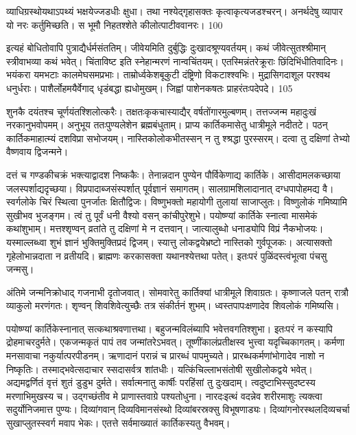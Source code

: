 व्याधिग्रस्थोयथाऽपथ्यं भक्षयेज्जडधीः क्षुधा।
तथा नश्येद्गृहासक्तः कृत्वाकृत्यजडश्चरन्।
अनर्थदेषु व्यापार यो नरः कर्तुमिच्छति।
स भूमौ निहतश्शेते कीलोत्पाटीववानरः।
100

इत्यहं बोधितोवापि पुत्राद्यैर्धर्मसंततिम्।
जीवेयमिति दुर्बुद्धिः दुःखादश्रूण्यवर्तयम्।
कथं जीवेत्सुतश्श्रीमान् स्त्रीवाभव्या कथं भवेत्।
चिंताविष्ट इति स्नेहान्मरणं नान्वचिंतयम्।
एतस्मिन्नंतरेक्रूराः छिंदिभिंधीतिवादिनः।
भयंकरा यमभटाः कालमेघसमप्रभाः।
ताम्रोर्ध्वकेशबूकुटी दंष्ट्रिणो विकटाश्श्वभिः।
मुद्रासिगदाशूल परश्वथ धनुर्धराः।
पाशैर्लोहमयैर्वेगाद् धृडंबद्धा ह्यधोमुखम्।
जिह्वां पाशेनकषतः प्राहरंतःपदेपदे।
105

शुनकै दयंतश्च चूर्णयंतश्शिलोत्करैः।
तक्षतःकृकचास्याद्यैर् वर्षतोंगारमुल्बणम्।
तत्तज्जन्म महादुःखं नरकानुभवोपमम्।
अनुभूय ततःपुण्यलेशेन ब्रह्मबंधुताम्।
प्राप्य कार्तिकमासेतु धात्रीमूले नदीतटे।
पठन् कार्तिकमाहात्म्यं दशविप्रा सभोजयम्।
नास्तिकोलोकभीतस्सन् न तु श्श्रद्धा पुरस्सरम्।
दत्वा तु दक्षिणां तेभ्यो वैष्णवाय द्विजन्मने।

दत्तं च गण्डकीचक्रं भक्त्याद्वादश निष्ककैः।
तेनान्नदान पुण्येन पौर्विकेणाद्य कार्तिके।
आसीदामलकच्छाया जलस्पर्शाद्यदृच्छया।
विप्रपादाब्जसंस्पर्शात् पूर्वज्ञानं समागतम्।
सालग्रामशिलादानात् दग्धपापोहमद्य वै।
स्वर्गलोके चिरं स्थित्वा पुनर्जातः क्षितौद्विजः।
विष्णुभक्तो महायोगी तुलायां साजाप्लुतः।
विष्णुलोकं गमिष्यामि सुखीभव भुजङ्गम।
त्वं तु पूर्वं धनी वैश्यो वसन् कांचीपुरेशुभे।
पयोष्ण्यां कार्तिके स्नात्वा मासमेकं कथांशुभाम्।
मत्तश्शृण्वन् व्रतांते तु दक्षिणां मे न दत्तवान्।
जात्यालुब्धो धनाड्योपि विप्रं नैकभोजयः।
यस्माल्लब्ध्वा शुभं ज्ञानं भुक्तिमुक्तिप्रदं द्विजम्।
स्यात्तु लोकद्वयेभ्रष्टो नास्तिको गुर्वपूजकः।
अत्यासक्तो गृहेलोभान्नदाता न व्रतीयदि।
ब्राह्मणः करकासक्ता यथानश्येत्तथा पतेत्।
इतःपरं पुळिंदस्त्वंभूत्वा पंचसु जन्मसु।

अंतिमे जन्मनिक्रोधाद् गजनाभी दृतोजवात्।
सोमवारेतु कार्तिक्यां धात्रीमूले शिवाग्रतः।
कृष्णाजले पतन् रात्रौ व्याकुलो मरणंगतः।
शृण्वन् शिवशिवेत्युच्छैः तत्र संकीर्तनं शुभम्।
ध्वस्तपापःक्षणादेव शिवलोकं गमिष्यसि।

पयोष्ण्यां कार्तिकेस्नानात् सत्कथाश्रवणात्तथा।
बहुजन्मविलंब्यापि भवेत्तवगतिश्शुभा।
इतःपरं न कस्यापि द्रोहमाचरदुर्मते।
एकजन्मकृतं पापं तव जन्मांतरेऽभवत्।
तूष्णींकालंप्रतीक्षस्व भुत्त्वा यदृच्चिकागतम्।
कर्मणा मनसावाचा नकुर्यात्परपीडनम्।
ऋणादानं परान्नं च प्रारब्धं पापमुच्यते।
प्रारब्धकर्मणांभोगादेव नाशो न निष्कृतिः।
तस्माद्भवेत्सदाचार स्सदासर्वत्र शांतधीः।
यत्किंचिल्लाभसंतोषी सुखीलोकद्वये भवेत्।
अद्यमद्वर्णितं वृत्तं शुतं डुडुभ दुर्मते।
सर्वात्मनातु कार्षीः परहिंसां तु दुःखदाम्।
त्वदुष्टाभिस्सुदष्टस्य मरणाभिमुखस्य च।
उद्गच्छंतीव मे प्राणास्तवाग्रे पश्यतोधुना।
नारदःइत्थं वदन्नेव शरीरमाशुः त्यक्त्वा
सदुर्योनिजमात्त पुण्यः।
दिव्यांगवान् दिव्यविमानसंस्थो
दिव्यांबरस्रक्सु विभूषणाड्यः।
दिव्यांगनोरस्थलदिव्यचर्चा
सुखाप्लुतस्स्वर्ग मवाप भेकः।
एतत्ते सर्वमाख्यातं कार्तिकस्यतु वैभवम्।

